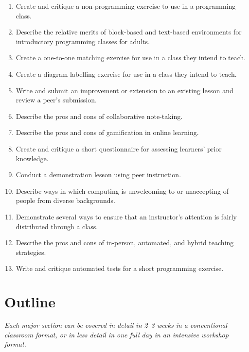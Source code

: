 \begin{enumerate}
\item
  Create and critique a non-programming exercise to use in a
  programming class.
\item
  Describe the relative merits of block-based and text-based
  environments for introductory programming classes for adults.
\item
  Create a one-to-one matching exercise for use in a class they intend
  to teach.
\item
  Create a diagram labelling exercise for use in a class they intend
  to teach.
\item
  Write and submit an improvement or extension to an existing lesson
  and review a peer's submission.
\item
  Describe the pros and cons of collaborative note-taking.
\item
  Describe the pros and cons of gamification in online learning.
\item
  Create and critique a short questionnaire for assessing learners'
  prior knowledge.
\item
  Conduct a demonstration lesson using peer instruction.
\item
  Describe ways in which computing is unwelcoming to or unaccepting of
  people from diverse backgrounds.
\item
  Demonstrate several ways to ensure that an instructor's attention is
  fairly distributed through a class.
\item
  Describe the pros and cons of in-person, automated, and hybrid
  teaching strategies.
\item
  Write and critique automated tests for a short programming exercise.
\end{enumerate}

\section{Outline}\label{outline}

\emph{Each major section can be covered in detail in 2--3 weeks in a
conventional classroom format, or in less detail in one full day in an
intensive workshop format.}

